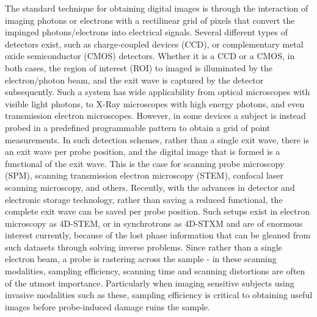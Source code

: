 \documentclass[aip, amsmath, amssymb, nobibnotes, nofootinbib, citeautoscript, reprint, superscriptaddress]{revtex4-2}
\begin{document}
    The standard technique for obtaining digital images is through the interaction of imaging photons or electrons with a rectilinear grid of pixels that convert the impinged photons/electrons into electrical signals.
    Several different types of detectors exist, such as charge-coupled devices (CCD), or complementary metal oxide semiconductor (CMOS) detectors\cite{electron_detectors_review, ccd_cmos_review}.
    Whether it is a CCD or a CMOS, in both cases, the region of interest (ROI) to imaged is illuminated by the electron/photon beam, and the exit wave is captured by the detector subsequently.
    Such a system has wide applicability from optical microscopes with visible light photons, to X-Ray microscopes with high energy photons, and even transmission electron microscopes.
    However, in some devices a subject is instead probed in a predefined programmable pattern to obtain a grid of point measurements.
    In such detection schemes, rather than a single exit wave, there is an exit wave per probe position, and the digital image that is formed is a functional of the exit wave.
    This is the case for scanning probe microscopy (SPM), scanning transmission electron microscopy (STEM), confocal laser scanning microscopy, and others.
    Recently, with the advances in detector and electronic storage technology, rather than saving a reduced functional, the complete exit wave can be saved per probe position.
    Such setups exist in electron microscopy as 4D-STEM, or in synchrotrons as 4D-STXM and are of enormous interest currently, because of the lost phase information that can be gleaned from such datasets through solving inverse problems\cite{ophus_4dstem}.
    Since rather than a single electron beam, a probe is rastering across the sample - in these scanning modalities, sampling efficiency, scanning time and scanning distortions are often of the utmost importance.
    Particularly when imaging sensitive subjects using invasive modalities such as these, sampling efficiency is critical to obtaining useful images before probe-induced damage ruins the sample.
\end{document}
